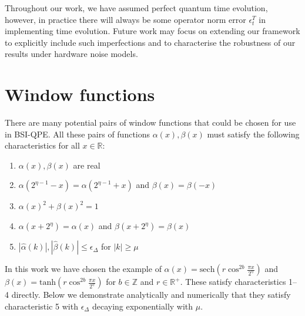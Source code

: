 \documentclass[aps,floatfix,10pt,amssymb,amsfont,amsmath,superscriptaddress,float,nofootinbib,longbibliography,nobalancelastpage,twocolumn]{revtex4-2}
\begin{document}
Throughout our work, we have assumed perfect quantum time evolution, however, in practice there will always be some operator norm error $\epsilon^T_t$ in implementing time evolution. Future work may focus on extending our framework to explicitly include such imperfections and to characterise the robustness of our results under hardware noise models.



\appendix
\onecolumngrid    
\section{Window functions}
\label{section:appendix}
There are many potential pairs of window functions that could be chosen for use in BSI-QPE. All these pairs of functions $\alpha(x), \beta(x)$ must satisfy the following characteristics for all $x \in \mathbb{R}$:
\begin{enumerate}
    \item $\alpha(x), \beta(x)$ are real
    \item $\alpha(2^{\eta-1}-x) = \alpha(2^{\eta-1}+x)$ and $\beta(x) = \beta(-x)$
    \item $\alpha(x)^2+\beta(x)^2 =1$
    \item $\alpha(x+2^{\eta}) = \alpha(x)$ and $\beta(x+2^{\eta}) = \beta(x)$
    \item $|\hat \alpha(k)|, |\hat \beta(k)| \leq \epsilon_\Delta$ for $|k| \geq \mu$
\end{enumerate}
In this work we have chosen the example of $\alpha(x) = \text{sech}( r\cos^{2b} \frac{\pi x}{2^{\eta}})$ and $\beta(x) = \text{tanh}(r \cos^{2b} \frac{\pi x}{2^{\eta}})$ for $b \in \mathbb{Z}$ and $r \in \mathbb{R}^+$. These satisfy characteristics 1--4 directly. Below we demonstrate analytically and numerically that they satisfy characteristic 5 with $\epsilon_{\Delta}$ decaying exponentially with $\mu$.
\end{document}
